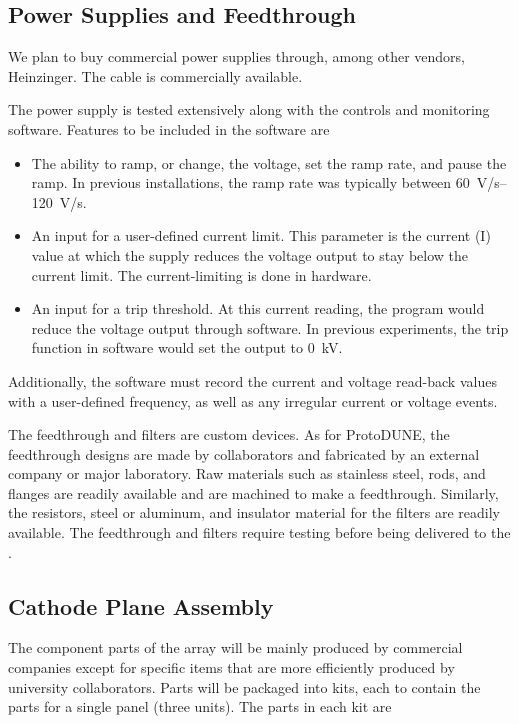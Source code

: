 \subsection{Power Supplies and Feedthrough}
\label{sec:fdsp-hv-supplies-feedthrough}

We plan to buy commercial power supplies through, among other vendors, Heinzinger. 
The  cable is commercially available.

The power supply is tested extensively along with the controls and monitoring software.  Features to be included in the software are
\begin{itemize}
\item The ability to ramp, or change, the voltage, set the ramp rate, and pause the ramp. %
In previous installations, the ramp rate was typically between \SIrange{60}{120}{V/s}.
\item An input for a user-defined current limit.  This parameter is the current (I) value at which the supply reduces the voltage output to stay below the current limit.  The current-limiting is done in hardware.
\item An input for a trip threshold.  At this current reading, the program would reduce the voltage output through software.  In previous experiments, the trip function in software would set the output to \SI{0}{kV}.
\end{itemize}
Additionally, the software must
record the current and voltage read-back values with a user-defined frequency, as well as any irregular current or voltage events.



The  feedthrough and filters are custom devices. As for ProtoDUNE, the feedthrough  designs are made by collaborators and fabricated by an external company or major laboratory.
 Raw materials such as stainless steel,  rods, and flanges are readily available and are machined to make a feedthrough. Similarly, the resistors, steel or aluminum, and insulator material for the filters are readily available. The feedthrough and filters require testing before being delivered to the . %
 
\subsection{Cathode Plane Assembly}
\label{sec:fdsp-hv-prod-cpa}
 The component parts of the  array will be mainly produced by commercial companies except for specific items that are more efficiently produced by university collaborators.  Parts will be packaged into kits, each to contain the parts for a single  panel
(three  units). The parts in each kit are

